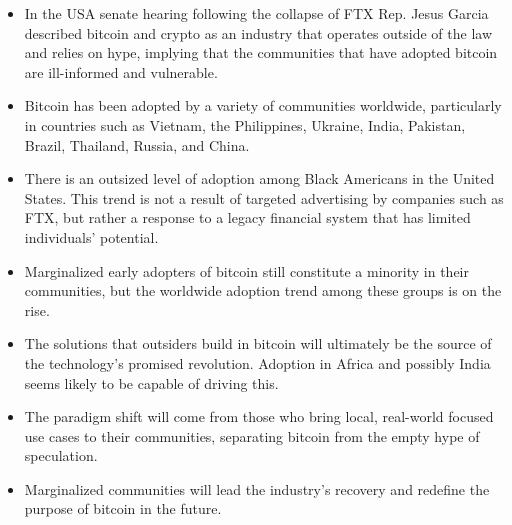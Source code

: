 \begin{itemize}
\item In the USA senate hearing following the collapse of FTX Rep. Jesus Garcia described bitcoin and crypto as an industry that operates outside of the law and relies on hype, implying that the communities that have adopted bitcoin are ill-informed and vulnerable.
\item Bitcoin has been adopted by a variety of communities worldwide, particularly in countries such as Vietnam, the Philippines, Ukraine, India, Pakistan, Brazil, Thailand, Russia, and China.
\item There is an outsized level of adoption among Black Americans in the United States. This trend is not a result of targeted advertising by companies such as FTX, but rather a response to a legacy financial system that has limited individuals' potential.
\item Marginalized early adopters of bitcoin still constitute a minority in their communities, but the worldwide adoption trend among these groups is on the rise.
\item The solutions that outsiders build in bitcoin will ultimately be the source of the technology's promised revolution. Adoption in Africa and possibly India seems likely to be capable of driving this.
\item The paradigm shift will come from those who bring local, real-world focused use cases to their communities, separating bitcoin from the empty hype of speculation.
\item Marginalized communities will lead the industry's recovery and redefine the purpose of bitcoin in the future.
\end{itemize} 

